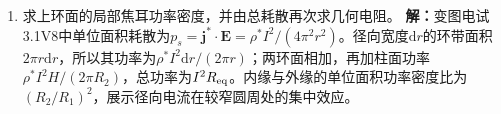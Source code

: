 \documentclass[UTF8,fontset=fandol,a4paper,11pt]{ctexart}
\begin{document}
\begin{enumerate}
\item 求上环面的局部焦耳功率密度，并由总耗散再次求几何电阻。
\textbf{解：}变图电试3.1V8中单位面积耗散为$p_s=\boldsymbol j^*\cdot\boldsymbol E=\rho^*I^2/(4\pi^2r^2)$。径向宽度$\mathrm dr$的环带面积$2\pi r\mathrm dr$，所以其功率为$\rho^*I^2\mathrm dr/(2\pi r)$；两环面相加，再加柱面功率$\rho^*I^2H/(2\pi R_2)$，总功率为$I^2R_{\rm eq}$。内缘与外缘的单位面积功率密度比为$(R_2/R_1)^2$，展示径向电流在较窄圆周处的集中效应。
\begin{center}\begin{minipage}{.98\linewidth}\centering
{}
\end{minipage}
\end{center}
\end{enumerate}
\end{document}
